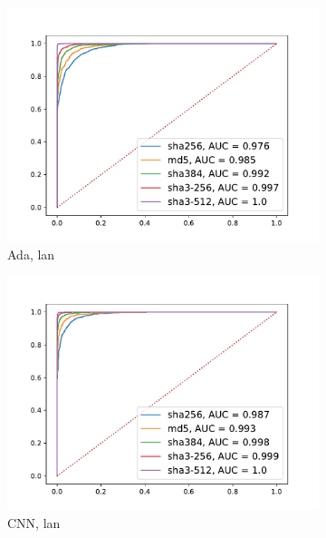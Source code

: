 \documentclass[12pt,a4paper,automark, toc=bib]{scrreprt}
\theoremstyle{definition}
\begin{document}
			\begin{figure}
				\begin{subfigure}{0.32\linewidth}
					\centering
					\includegraphics[width=\linewidth]{figures/lan_50_AdaBoost.pdf}
					\caption{Ada, lan}
				\end{subfigure}
				\begin{subfigure}{0.32\linewidth}
					\centering
					\includegraphics[width=\linewidth]{figures/lan_50_keras.pdf}
					\caption{CNN, lan}
				\end{subfigure}
				\begin{subfigure}{0.32\linewidth}
					\centering

\end{subfigure}
\end{figure}
\end{document}
